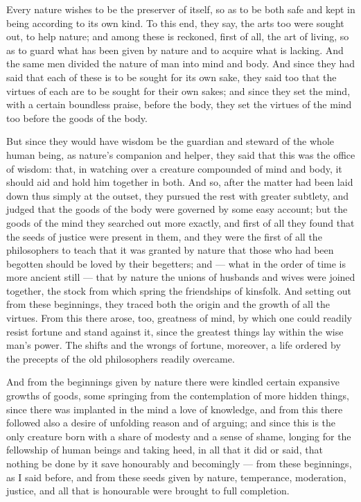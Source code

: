  Every nature wishes to be the preserver of itself, so as to be both safe and kept in being according to its own kind. To this end, they say, the arts too were sought out, to help nature; and among these is reckoned, first of all, the art of living, so as to guard what has been given by nature and to acquire what is lacking. And the same men divided the nature of man into mind and body. And since they had said that each of these is to be sought for its own sake, they said too that the virtues of each are to be sought for their own sakes; and since they set the mind, with a certain boundless praise, before the body, they set the virtues of the mind too before the goods of the body.

 But since they would have wisdom be the guardian and steward of the whole human being, as nature's companion and helper, they said that this was the office of wisdom: that, in watching over a creature compounded of mind and body, it should aid and hold him together in both. And so, after the matter had been laid down thus simply at the outset, they pursued the rest with greater subtlety, and judged that the goods of the body were governed by some easy account; but the goods of the mind they searched out more exactly, and first of all they found that the seeds of justice were present in them, and they were the first of all the philosophers to teach that it was granted by nature that those who had been begotten should be loved by their begetters; and — what in the order of time is more ancient still — that by nature the unions of husbands and wives were joined together, the stock from which spring the friendships of kinsfolk. And setting out from these beginnings, they traced both the origin and the growth of all the virtues. From this there arose, too, greatness of mind, by which one could readily resist fortune and stand against it, since the greatest things lay within the wise man's power. The shifts and the wrongs of fortune, moreover, a life ordered by the precepts of the old philosophers readily overcame.

 And from the beginnings given by nature there were kindled certain expansive growths of goods, some springing from the contemplation of more hidden things, since there was implanted in the mind a love of knowledge, and from this there followed also a desire of unfolding reason and of arguing; and since this is the only creature born with a share of modesty and a sense of shame, longing for the fellowship of human beings and taking heed, in all that it did or said, that nothing be done by it save honourably and becomingly — from these beginnings, as I said before, and from these seeds given by nature, temperance, moderation, justice, and all that is honourable were brought to full completion.

